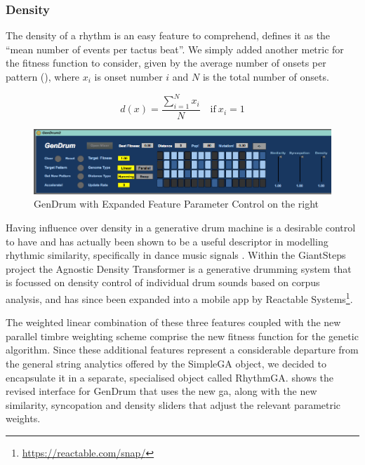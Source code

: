 {{\subsubsection{Density}

The density of a rhythm is an easy feature to comprehend, \cite{Wiggins2012a} defines it as the ``mean number of events per tactus beat''. We simply added another metric for the fitness function to consider, given by the average number of onsets per pattern (), where $x_i$ is onset number $i$ and $N$ is the total number of onsets.

\begin{equation}
\label{eq:density}
	d(x)=\frac{\sum_{i=1}^{N}x_i}{N} \quad \text{if}\ x_i=1
\end{equation}

\begin{figure}
	\begin{center}
		\includegraphics[width=1.0\textwidth]{ch03_symbolic/figures/gendrum2.png}
	\end{center}
	\caption[GenDrum with Expanded Feature Parameter Control]{GenDrum with Expanded Feature Parameter Control on the right}
	\label{fig:gendrum2}
\end{figure}

Having influence over density in a generative drum machine is a desirable control to have and  has actually been shown to be a useful descriptor in modelling rhythmic similarity, specifically in dance music signals \citep{Panteli2014a}. Within the GiantSteps project the Agnostic Density Transformer \citep{Jorda2016} is a generative drumming system that is focussed on density control of individual drum sounds based on corpus analysis, and has since been expanded into a mobile app by Reactable Systems\footnote{\url{https://reactable.com/snap/}}.

The weighted linear combination of these three features coupled with the new parallel timbre weighting scheme comprise the new fitness function for the genetic algorithm. Since these additional features represent a considerable departure from the general string analytics offered by the SimpleGA object, we decided to encapsulate it in a separate, specialised object called RhythmGA.  shows the revised interface for GenDrum that uses the new \acrshort{ga}, along with the new similarity, syncopation and density  sliders that adjust the relevant parametric weights.

}}
